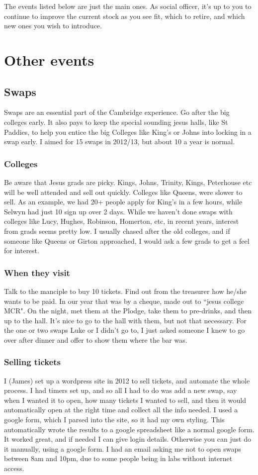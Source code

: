 \documentclass[9.5pt]{article} %
\begin{document}
The events listed below are just the main ones. As social officer, it's up to you to continue to improve the current stock as you see fit, which to retire, and which new ones you wish to introduce. 

\section{Other events}
\subsection{Swaps}
Swaps are an essential part of the Cambridge experience. Go after the big colleges early. It also pays to keep the special sounding jesus halls, like St Paddies, to help you entice the big Colleges like King's or Johns into locking in a swap early. I aimed for 15 swaps in 2012/13, but about 10 a year is normal.
\subsubsection{Colleges}
Be aware that Jesus grads are picky. Kings, Johns, Trinity, Kings, Peterhouse etc will be well attended and sell out quickly. 
Colleges like Queens, were slower to sell. As an example, we had 20+ people apply for King's in a few hours, while Selwyn had just 10 sign up over 2 days. While we haven't done swaps with colleges like Lucy, Hughes, Robinson, Homerton, etc, in recent years, interest from grads seems pretty low. 
I usually chased after the old colleges, and if someone like Queens or Girton approached, I would ask a few grads to get a feel for interest.
\subsubsection{When they visit}
Talk to the manciple to buy 10 tickets. Find out from the treasurer how he/she wants to be paid. In our year that was by a cheque, made out to ``jesus college MCR". On the night, met them at the Plodge, take them to pre-drinks, and then up to the hall. It's nice to go to the hall with them, but not that necessary. For the one or two swaps Luke or I didn't go to, I just asked someone I knew to go over after dinner and offer to show them where the bar was.

\subsubsection{Selling tickets}
I (James) set up a wordpress site in 2012 to sell tickets, and automate the whole process. I had timers set up, and so all I had to do was add a new swap, say when I wanted it to open, how many tickets I wanted to sell, and then it would automatically open at the right time and collect all the info needed. I used a google form, which I parsed into the site, so it had my own styling. This automatically wrote the results to a google spreadsheet like a normal google form. It worked great, and if needed I can give login details. Otherwise you can just do it manually, using a google form. I had an email asking me not to open swaps between 8am and 10pm, due to some people being in labs without internet access. 
\end{document}
